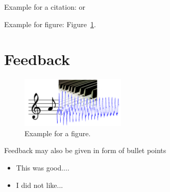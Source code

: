 \documentclass[a4paper, 9pt, twocolumn]{extarticle}
\begin{document}

Example for a citation: \cite{Mueller07_InformationRetrieval_SPRINGER}
or \cite{Mueller15_FundamentalsMusicProcessig_SPRINGER}

Example for figure: Figure~\ref{figure:example}.

\newpage

\section{Feedback}
\label{section:feedback}


\begin{figure}[t]
\begin{center}
\includegraphics[width=5cm]{figure_example.png}
\end{center}
\caption{
Example for a figure.
}
\label{figure:example}
\end{figure}


Feedback may also be given in form of bullet points
\begin{itemize}
\item This was good....
\item I did not like...
\end{itemize}




\small

\end{document}
